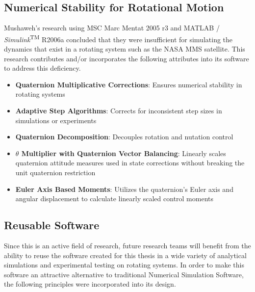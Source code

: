 \subsection{Numerical Stability for Rotational Motion}
\label{subsec:NumericalStabilityforRotationalMotion}

Mushaweh's research using MSC Marc Mentat 2005 r3 and MATLAB / \textit{Simulink}\textsuperscript{TM} R2006a concluded that they were insufficient for simulating the dynamics that exist in a rotating system such as the NASA MMS satellite.  This research contributes and/or incorporates the following attributes into its software to address this deficiency.

\begin{itemize}
  \item \textbf{Quaternion Multiplicative Corrections}: Ensures numerical stability in rotating systems
  \item \textbf{Adaptive Step Algorithms}: Corrects for inconsistent step sizes in simulations or experiments
  \item \textbf{Quaternion Decomposition}: Decouples rotation and nutation control
  \item \textbf{$\theta$ Multiplier with Quaternion Vector Balancing}: Linearly scales quaternion attitude measures used in state corrections without breaking the unit quaternion restriction
  \item \textbf{Euler Axis Based Moments}: Utilizes the quaternion's Euler axis and angular displacement to calculate linearly scaled control moments
\end{itemize}

\subsection{Reusable Software}
\label{subsec:ReusableSoftware}

Since this is an active field of research, future research teams will benefit from the ability to reuse the software created for this thesis in a wide variety of analytical simulations and experimental testing on rotating systems.  In order to make this software an attractive alternative to traditional Numerical Simulation Software, the following principles were incorporated into its design.

